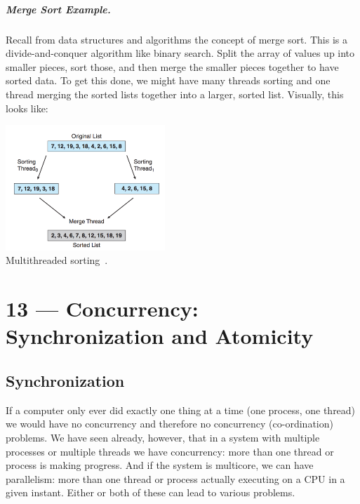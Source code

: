\documentclass[a4paper]{report}
\begin{document}
\paragraph{Merge Sort Example.}
Recall from data structures and algorithms the concept of merge sort. This is a divide-and-conquer algorithm like binary search. Split the array of values up into smaller pieces, sort those, and then merge the smaller pieces together to have sorted data. To get this done, we might have many threads sorting and one thread merging the sorted lists together into a larger, sorted list. Visually, this looks like:

\begin{center}
	\includegraphics[width=0.45\textwidth]{images/multithread-sort.png}\\
	Multithreaded sorting~\cite{osc}.
\end{center}









\chapter*{13 --- Concurrency: Synchronization and Atomicity}


\section*{Synchronization}
If a computer only ever did exactly one thing at a time (one process, one thread) we would have no concurrency and therefore no concurrency (co-ordination) problems. We have seen already, however, that in a system with multiple processes or multiple threads we have concurrency: more than one thread or process is making progress. And if the system is multicore, we can have parallelism: more than one thread or process actually executing on a CPU in a given instant. Either or both of these can lead to various problems.
\end{document}
